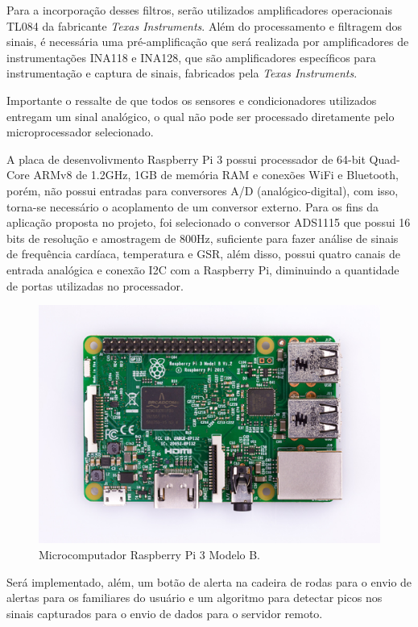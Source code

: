 Para a incorporação desses filtros, serão utilizados amplificadores operacionais TL084 da fabricante \textit{Texas Instruments}. Além do processamento e filtragem dos sinais, é necessária uma pré-amplificação que será realizada por amplificadores de instrumentações INA118 e INA128, que são amplificadores específicos para instrumentação e captura de sinais, fabricados pela \textit{Texas Instruments}.

Importante o ressalte de que todos os sensores e condicionadores utilizados
entregam um sinal analógico, o qual não pode ser processado diretamente
pelo microprocessador selecionado.

A placa de desenvolivmento Raspberry Pi 3 possui processador de 64-bit Quad-Core ARMv8 de 1.2GHz, 1GB de memória RAM e conexões WiFi e Bluetooth, porém, não possui entradas para conversores A/D (analógico-digital), com isso, torna-se necessário o acoplamento de um conversor externo. Para os fins da aplicação proposta no projeto, foi selecionado o conversor ADS1115 que possui 16 bits de resolução e amostragem de 800Hz, suficiente para fazer análise de sinais de frequência cardíaca, temperatura e GSR, além disso, possui quatro canais de entrada analógica e conexão I2C com a Raspberry Pi, diminuindo a quantidade de portas utilizadas no processador. 

\begin{figure}[H]
  \centering
    \includegraphics[width=\textwidth]{figuras/rasp.eps}
  \caption{Microcomputador Raspberry Pi 3 Modelo B.}
  \label{fig:rasp}
\end{figure}

Será implementado, além, um botão de alerta na cadeira de rodas para o envio de alertas para os familiares do usuário e um algoritmo para detectar picos nos sinais capturados para o envio de dados para o servidor remoto.



